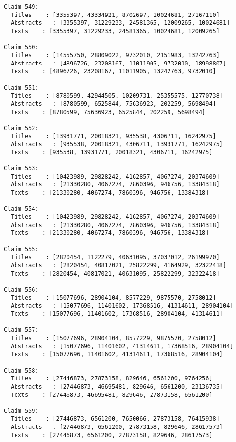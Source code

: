 \documentclass[11pt]{article}
\begin{document}
\begin{Verbatim}[commandchars=\\\{\}]
Claim 549:
  Titles    : [3355397, 43334921, 8702697, 10024681, 27167110]
  Abstracts   : [3355397, 31229233, 24581365, 12009265, 10024681]
  Texts    : [3355397, 31229233, 24581365, 10024681, 12009265]

Claim 550:
  Titles    : [14555750, 28809022, 9732010, 2151983, 13242763]
  Abstracts   : [4896726, 23208167, 11011905, 9732010, 18998807]
  Texts    : [4896726, 23208167, 11011905, 13242763, 9732010]

Claim 551:
  Titles    : [8780599, 42944505, 10209731, 25355575, 12770738]
  Abstracts   : [8780599, 6525844, 75636923, 202259, 5698494]
  Texts    : [8780599, 75636923, 6525844, 202259, 5698494]

Claim 552:
  Titles    : [13931771, 20018321, 935538, 4306711, 16242975]
  Abstracts   : [935538, 20018321, 4306711, 13931771, 16242975]
  Texts    : [935538, 13931771, 20018321, 4306711, 16242975]

Claim 553:
  Titles    : [10423989, 29828242, 4162857, 4067274, 20374609]
  Abstracts   : [21330280, 4067274, 7860396, 946756, 13384318]
  Texts    : [21330280, 4067274, 7860396, 946756, 13384318]

Claim 554:
  Titles    : [10423989, 29828242, 4162857, 4067274, 20374609]
  Abstracts   : [21330280, 4067274, 7860396, 946756, 13384318]
  Texts    : [21330280, 4067274, 7860396, 946756, 13384318]

Claim 555:
  Titles    : [2820454, 1122279, 40631095, 37037012, 26199970]
  Abstracts   : [2820454, 40817021, 25822299, 4164929, 32322418]
  Texts    : [2820454, 40817021, 40631095, 25822299, 32322418]

Claim 556:
  Titles    : [15077696, 28904104, 8577229, 9875570, 2758012]
  Abstracts   : [15077696, 11401602, 17368516, 41314611, 28904104]
  Texts    : [15077696, 11401602, 17368516, 28904104, 41314611]

Claim 557:
  Titles    : [15077696, 28904104, 8577229, 9875570, 2758012]
  Abstracts   : [15077696, 11401602, 41314611, 17368516, 28904104]
  Texts    : [15077696, 11401602, 41314611, 17368516, 28904104]

Claim 558:
  Titles    : [27446873, 27873158, 829646, 6561200, 9764256]
  Abstracts   : [27446873, 46695481, 829646, 6561200, 23136735]
  Texts    : [27446873, 46695481, 829646, 27873158, 6561200]

Claim 559:
  Titles    : [27446873, 6561200, 7650066, 27873158, 76415938]
  Abstracts   : [27446873, 6561200, 27873158, 829646, 28617573]
  Texts    : [27446873, 6561200, 27873158, 829646, 28617573]


\end{Verbatim}
\end{document}
